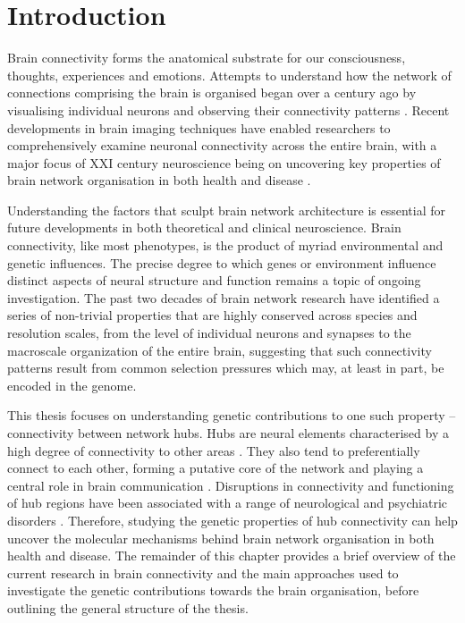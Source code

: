 \chapter{Introduction}
\label{ch:Introduction}

Brain connectivity forms the anatomical substrate for our consciousness, thoughts, experiences and emotions. Attempts to understand how the network of connections comprising the brain is organised began over a century ago by visualising individual neurons and observing their connectivity patterns \citep{RamonyCajal1995}. Recent developments in brain imaging techniques have enabled researchers to comprehensively examine neuronal connectivity across the entire brain, with a major focus of XXI century neuroscience being on uncovering key properties of brain network organisation in both health and disease \citep{VandenHeuvel2010b,Bullmore2012,Fornito2015}.

Understanding the factors that sculpt brain network architecture is essential for future developments in both theoretical and clinical neuroscience. Brain connectivity, like most phenotypes, is the product of myriad environmental and genetic influences. The precise degree to which genes or environment influence distinct aspects of neural structure and function remains a topic of ongoing investigation. The past two decades of brain network research have identified a series of non-trivial properties that are highly conserved across species and resolution scales, from the level of individual neurons and synapses to the macroscale organization of the entire brain, suggesting that such connectivity patterns result from common selection pressures which may, at least in part, be encoded in the genome.

This thesis focuses on understanding genetic contributions to one such property -- connectivity between network hubs. Hubs are neural elements  characterised by a high degree of connectivity to other areas \citep{VandenHeuvel2013b}. They also tend to preferentially connect to each other, forming a putative core of the network and playing a central role in brain communication \citep{VandenHeuvel2011,VandenHeuvel2013a}. Disruptions in connectivity and functioning of hub regions have been associated with a range of neurological and psychiatric disorders \citep{Crossley2014,VandenHeuvel2013b,Fornito2015}. Therefore, studying the genetic properties of hub connectivity can help uncover the molecular mechanisms behind brain network organisation in both health and disease. The remainder of this chapter provides a brief overview of the current research in brain connectivity and the main approaches used to investigate the genetic contributions towards the brain organisation, before outlining the general structure of the thesis.


